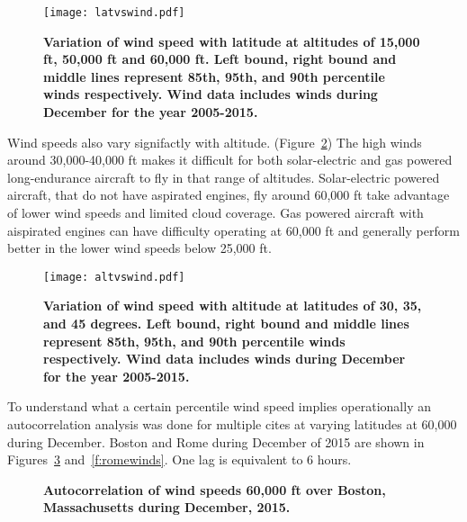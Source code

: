 \documentclass[]{aiaa-tc}%
\begin{document}
\begin{figure}[H]
	\begin{center}
	\texttt{[image: latvswind.pdf]}
    \caption{ \textbf{ Variation of wind speed with latitude at altitudes of 15,000 ft, 50,000 ft and 60,000 ft.  Left bound, right bound and middle lines represent 85th, 95th, and 90th percentile winds respectively. Wind data includes winds during December for the year 2005-2015.}}
	\label{f:latvswind}
	\end{center}
\end{figure}

Wind speeds also vary signifactly with altitude. (Figure~\ref{f:altvswind})
The high winds around 30,000-40,000 ft makes it difficult for both solar-electric and gas powered long-endurance aircraft to fly in that range of altitudes.  
Solar-electric powered aircraft, that do not have aspirated engines, fly around 60,000 ft take advantage of lower wind speeds and limited cloud coverage.
Gas powered aircraft with aispirated engines can have difficulty operating at 60,000 ft and generally perform better in the lower wind speeds below 25,000 ft.

\begin{figure}[H]
	\begin{center}
	\texttt{[image: altvswind.pdf]}
    \caption{ \textbf{ Variation of wind speed with altitude at latitudes of 30, 35, and 45 degrees.  Left bound, right bound and middle lines represent 85th, 95th, and 90th percentile winds respectively. Wind data includes winds during December for the year 2005-2015.}}
	\label{f:altvswind}
	\end{center}
\end{figure}

To understand what a certain percentile wind speed implies operationally an autocorrelation analysis was done for multiple cites at varying latitudes at 60,000 during December. 
Boston and Rome during December of 2015 are shown in Figures~\ref{f:bostonwinds} and~\ref{f:romewinds}. 
One lag is equivalent to 6 hours. 

\begin{figure}[H]
 \begin{subfigmatrix}{2}%
 \end{subfigmatrix}
 \caption{\textbf{Autocorrelation of wind speeds 60,000 ft over Boston, Massachusetts during December, 2015. }}
 \label{f:bostonwinds}
\end{figure}
\end{document}
